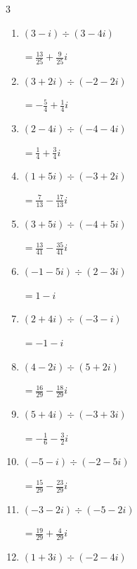 \begin{multicols}{3}
\begin{enumerate}
        $\displaystyle =\frac{2}{5}-\frac{3}{5}i$

  \item $\displaystyle (3-i)\div(3-4i)$

        $\displaystyle =\frac{13}{25}+\frac{9}{25}i$

  \item $\displaystyle (3+2i)\div(-2-2i)$

        $\displaystyle =-\frac{5}{4}+\frac{1}{4}i$

  \item $\displaystyle (2-4i)\div(-4-4i)$

        $\displaystyle =\frac{1}{4}+\frac{3}{4}i$

  \item $\displaystyle (1+5i)\div(-3+2i)$

        $\displaystyle =\frac{7}{13}-\frac{17}{13}i$

  \item $\displaystyle (3+5i)\div(-4+5i)$

        $\displaystyle =\frac{13}{41}-\frac{35}{41}i$

  \item $\displaystyle (-1-5i)\div(2-3i)$

        $\displaystyle =1-i$

  \item $\displaystyle (2+4i)\div(-3-i)$

        $\displaystyle =-1-i$

\columnbreak %

\resetques

  \item $\displaystyle (4-2i)\div(5+2i)$

        $\displaystyle =\frac{16}{29}-\frac{18}{29}i$

  \item $\displaystyle (5+4i)\div(-3+3i)$

        $\displaystyle =-\frac{1}{6}-\frac{3}{2}i$

  \item $\displaystyle (-5-i)\div(-2-5i)$

        $\displaystyle =\frac{15}{29}-\frac{23}{29}i$

  \item $\displaystyle (-3-2i)\div(-5-2i)$

        $\displaystyle =\frac{19}{29}+\frac{4}{29}i$

  \item $\displaystyle (1+3i)\div(-2-4i)$


\end{enumerate}
\end{multicols}
